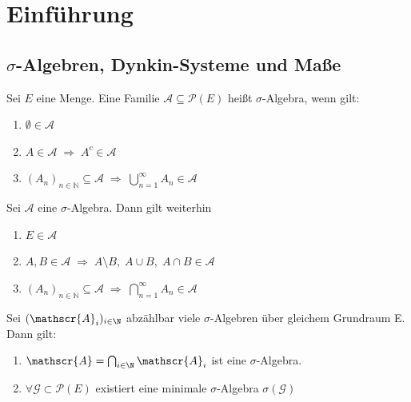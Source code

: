 \documentclass[11pt, a4paper]{article}
\begin{document}

\tableofcontents

\newpage

\section{Einführung}






\subsection{$\sigma$-Algebren, Dynkin-Systeme und Maße}

\begin{definition} \Theorem
Sei $E$ eine Menge. Eine Familie $\mathscr{A} \subseteq \mathscr{P}(E)$ heißt
$\sigma$-Algebra, wenn gilt:

\begin{enumerate}
  \item $\emptyset \in \mathscr{A}$
  \item $A \in \mathscr{A} \;\Rightarrow\; A^{c} \in \mathscr{A}$
  \item$ (A_n)_{n \in \mathbb{N}} \subseteq \mathscr{A}
        \;\Rightarrow\; \bigcup_{n=1}^{\infty} A_n \in \mathscr{A}$
\end{enumerate}
\end{definition}

\begin{corollary}
    Sei $\mathscr{A}$ eine $\sigma$-Algebra. Dann gilt weiterhin
\begin{enumerate}
  \item $E \in \mathscr{A}$
  \item $A, B\in \mathscr{A} \;\Rightarrow\; A\setminus B,\; A\cup B,\; A\cap B \in \mathscr{A}$
  \item$ (A_n)_{n \in \mathbb{N}} \subseteq \mathscr{A}
        \;\Rightarrow\; \bigcap_{n=1}^{\infty} A_n \in \mathscr{A}$
\end{enumerate}
\end{corollary}

\begin{theorem}
     Sei $(\mathscr{A}_i)_{i\in \N} $ abzählbar viele $\sigma$-Algebren über gleichem Grundraum E. Dann gilt:

     \begin{enumerate}
         \item $\mathscr{A} = \bigcap _{i\in \N} \mathscr{A}_i$ ist eine $\sigma$-Algebra.
         \item $\forall \mathscr{G} \subset \mathscr{P}(E)$ existiert eine minimale $\sigma$-Algebra $\sigma(\mathscr{G})$
     \end{enumerate}
\end{theorem}
\end{document}
